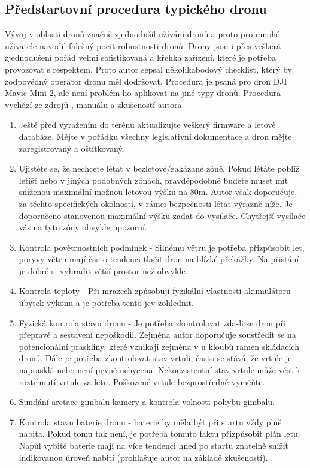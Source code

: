 \subsection{Předstartovní procedura typického dronu}
Vývoj v oblasti dronů značně zjednodušil užívání dronů a proto pro mnohé uživatele navodil falešný pocit robustnosti dronů. Drony jsou i přes veškerá zjednodušení pořád velmi sofistikovaná a křehká zařízení, které je potřeba provozovat s respektem. Proto autor sepsal několikabodový checklist, který by zodpovědný operátor dronu měl dodržovat.  Procedura je psaná pro dron DJI Mavic Mini 2, ale není problém ho aplikovat na jiné typy dronů. Procedura vychází ze zdrojů \cite{PreflightChecklistPdf,PreflightChecklistSaftyCulture}, manuálu \cite{PreflightChecklistDJI} a zkušeností autora. 
\begin{enumerate}
    \item Ještě před vyražením do terénu aktualizujte veškerý firmware a letové databáze. Mějte v pořádku všechny legislativní dokumentace a dron mějte zaregistrovaný a oštítkovaný.
    \item Ujistěte se, že nechcete létat v bezletové/zakázané zóně. Pokud létáte poblíž letišť nebo v jiných podobných zónách, pravděpodobně budete muset mít sníženou maximální možnou letovou výšku na 80m. Autor však doporučuje, za těchto specifických okolností, v rámci bezpečnosti létat výrazně níže. Je doporučeno stanovenou maximální výšku zadat do vysílače. Chytřejší vysílače vás na tyto zóny obvykle upozorní. 
    \item Kontrola povětrnostních podmínek - Silnému větru je potřeba přizpůsobit let, poryvy větru mají často tendenci tlačit dron na blízké překážky. Na přistání je dobré si vyhradit větší prostor než obvykle.
    \item Kontrola teploty - Při mrazech způsobují fyzikální vlastnosti akumulátoru úbytek výkonu a je potřeba tento jev zohlednit.
    \item Fyzická kontrola stavu dronu - Je potřeba zkontrolovat zda-li se dron při přepravě a sestavení nepoškodil. Zejména autor doporučuje soustředit se na potencionální praskliny, které vznikají zejména v u kloubů ramen skládacích dronů. Dále je potřeba zkontrolovat stav vrtulí, často se stává, že vrtule je naprasklá nebo není pevně uchycena. Nekonzistentní stav vrtule může vést k roztrhnutí vrtule za letu. Poškozené vrtule bezprostředně vyměňte.
    \item Sundání aretace gimbalu kamery a kontrola volnosti pohybu gimbalu.
    \item Kontrola stavu baterie dronu - baterie by měla být při startu vždy plně nabita. Pokud tomu tak není, je potřeba tomuto faktu přizpůsobit plán letu. Napůl vybité baterie mají na více tendenci hned po startu znatelně snížit indikovanou úroveň nabití (prohlašuje autor na základě zkušeností).

\end{enumerate}

